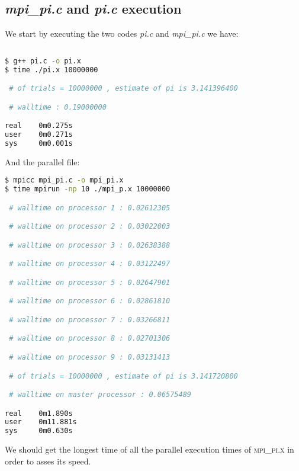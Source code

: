 \documentclass[11pt]{scrartcl} %
\begin{document}
\subsection{\textit{mpi\_pi.c} and \textit{pi.c} execution}
We start by executing the two codes \textit{pi.c} and \textit{mpi\_pi.c} we have:

\begin{lstlisting}[language=bash]
  
$ g++ pi.c -o pi.x
$ time ./pi.x 10000000

 # of trials = 10000000 , estimate of pi is 3.141396400 

 # walltime : 0.19000000 

real    0m0.275s
user    0m0.271s
sys     0m0.001s
\end{lstlisting}
And the parallel file:
\begin{lstlisting}[language=bash]
$ mpicc mpi_pi.c -o mpi_pi.x
$ time mpirun -np 10 ./mpi_p.x 10000000

 # walltime on processor 1 : 0.02612305 

 # walltime on processor 2 : 0.03022003 

 # walltime on processor 3 : 0.02638388 

 # walltime on processor 4 : 0.03122497 

 # walltime on processor 5 : 0.02647901 

 # walltime on processor 6 : 0.02861810 

 # walltime on processor 7 : 0.03266811 

 # walltime on processor 8 : 0.02701306 

 # walltime on processor 9 : 0.03131413 

 # of trials = 10000000 , estimate of pi is 3.141720800 

 # walltime on master processor : 0.06575489 

real    0m1.890s
user    0m11.881s
sys     0m0.630s
\end{lstlisting}

We should get the longest time of all the parallel execution times of \textsc{mpi\_pi.x} in order to asses its speed.
\end{document}
